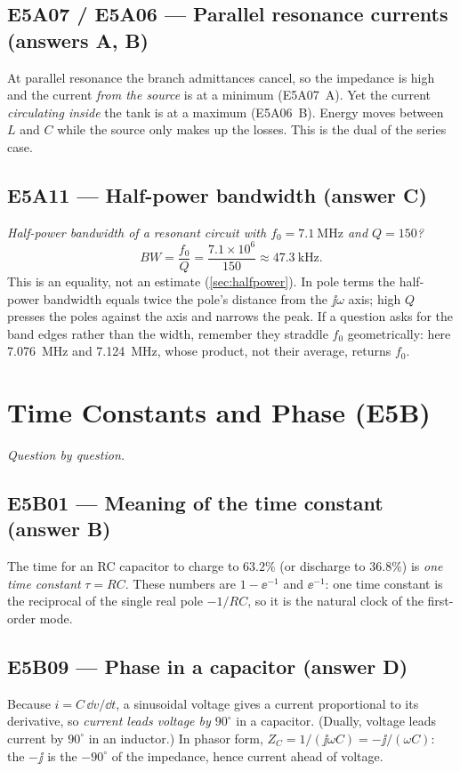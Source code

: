 \subsection*{E5A07 / E5A06 --- Parallel resonance currents (answers A, B)}
At parallel resonance the branch admittances cancel, so the impedance is high and
the current \emph{from the source} is at a minimum (E5A07~A). Yet the current
\emph{circulating inside} the tank is at a maximum (E5A06~B). Energy moves between
\(L\) and \(C\) while the source only makes up the losses. This is the dual of the
series case.

\subsection*{E5A11 --- Half-power bandwidth (answer C)}
\emph{Half-power bandwidth of a resonant circuit with \(f_0=\SI{7.1}{\mega\hertz}\)
and \(Q=150\)?}
\[
BW=\frac{f_0}{Q}=\frac{7.1\times10^6}{150}\approx\SI{47.3}{\kilo\hertz}.
\]
This is an equality, not an estimate (\cref{sec:halfpower}). In pole terms the
half-power bandwidth equals twice the pole's distance from the \(\jj\omega\) axis;
high \(Q\) presses the poles against the axis and narrows the peak. If a question
asks for the band edges rather than the width, remember they straddle \(f_0\)
geometrically: here \SI{7.076}{\mega\hertz} and \SI{7.124}{\mega\hertz}, whose
product, not their average, returns \(f_0\).

\section{Time Constants and Phase (E5B)}
\emph{Question by question.}

\subsection*{E5B01 --- Meaning of the time constant (answer B)}
The time for an RC capacitor to charge to \(63.2\%\) (or discharge to \(36.8\%\))
is \emph{one time constant} \(\tau=RC\). These numbers are \(1-\ee^{-1}\) and
\(\ee^{-1}\): one time constant is the reciprocal of the single real pole
\(-1/RC\), so it is the natural clock of the first-order mode.

\subsection*{E5B09 --- Phase in a capacitor (answer D)}
Because \(i=C\,\dd v/\dd t\), a sinusoidal voltage gives a current proportional to
its derivative, so \emph{current leads voltage by \(90^\circ\)} in a capacitor.
(Dually, voltage leads current by \(90^\circ\) in an inductor.) In phasor form,
\(Z_C=1/(\jj\omega C)=-\jj/(\omega C)\): the \(-\jj\) is the \(-90^\circ\) of the
impedance, hence current ahead of voltage.

